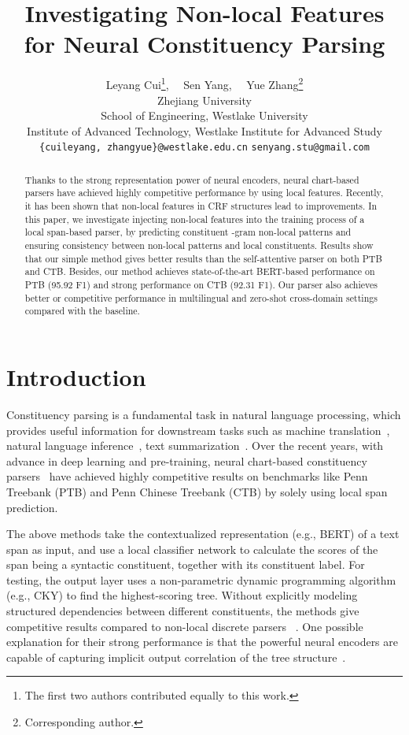 \documentclass[11pt]{article}
\title{Investigating Non-local Features for Neural Constituency Parsing}
\author{
  Leyang Cui\thanks{\quad The first two authors contributed equally to this work.}, \ \ Sen Yang, \ \ Yue Zhang\thanks{\quad Corresponding author.} \\
Zhejiang University \\
  School of Engineering, Westlake University \\
  Institute of Advanced Technology, Westlake Institute for Advanced Study \\
 \texttt{\{cuileyang, zhangyue\}@westlake.edu.cn} \hspace{5pt} \texttt{senyang.stu@gmail.com}
  
  }
\begin{document}
\maketitle
\begin{abstract}

Thanks to the strong representation power of neural encoders, neural chart-based parsers have achieved highly competitive performance by using local features. 
Recently, it has been shown that non-local features in CRF structures lead to improvements. 
In this paper, we investigate injecting non-local features into the training process of a local span-based parser, by predicting constituent -gram non-local patterns and ensuring consistency between non-local patterns and local constituents. 
Results show that our simple method gives better results than the self-attentive parser on both PTB and CTB. 
Besides, our method achieves state-of-the-art BERT-based performance on PTB (95.92 F1) and strong performance on CTB (92.31 F1). 
Our parser also achieves better or competitive performance in multilingual and zero-shot cross-domain settings compared with the baseline.

\end{abstract}

\section{Introduction}

Constituency parsing is a fundamental task in natural language processing, which provides useful information for downstream tasks such as machine translation~\cite{tree-mt}, natural language inference~\cite{nli}, text summarization~\cite{cp-summarization}. Over the recent years, with advance in deep learning and pre-training, neural chart-based constituency parsers~\cite{minimal-span,san-constituency} have achieved highly competitive results on benchmarks like Penn Treebank (PTB) and Penn Chinese Treebank (CTB) by solely using local span prediction.



The above methods take the contextualized representation (e.g., BERT) of a text span as input, and use a local classifier network to calculate the scores of the span being a syntactic constituent, together with its constituent label. For testing, the output layer uses a non-parametric dynamic programming algorithm (e.g., CKY) to find the highest-scoring tree. Without explicitly modeling structured dependencies between different constituents, the methods give competitive results compared to non-local discrete parsers ~\cite{minimal-span,san-constituency}.
One possible explanation for their strong performance is that the powerful neural encoders are capable of capturing implicit output correlation of the tree structure~\cite{minimal-span, going-on-parser, two-local-model}.
\end{document}

